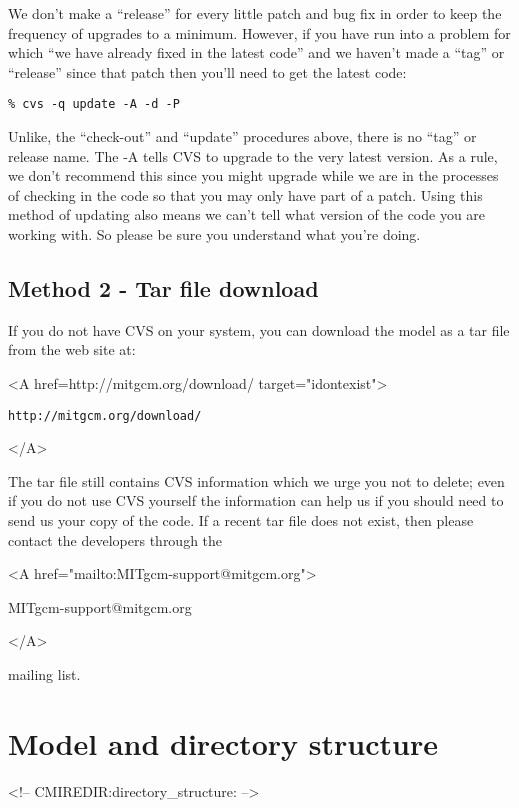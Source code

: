 We don't make a ``release'' for every little patch and bug fix in
order to keep the frequency of upgrades to a minimum. However, if you
have run into a problem for which ``we have already fixed in the
latest code'' and we haven't made a ``tag'' or ``release'' since that
patch then you'll need to get the latest code:
\begin{verbatim}
% cvs -q update -A -d -P
\end{verbatim}
Unlike, the ``check-out'' and ``update'' procedures above, there is no
``tag'' or release name. The -A tells CVS to upgrade to the
very latest version. As a rule, we don't recommend this since you
might upgrade while we are in the processes of checking in the code so
that you may only have part of a patch. Using this method of updating
also means we can't tell what version of the code you are working
with. So please be sure you understand what you're doing.

\subsection{Method 2 - Tar file download}
\label{sec:conventionalDownload}

If you do not have CVS on your system, you can download the model as a
tar file from the web site at:
\begin{rawhtml} <A href=http://mitgcm.org/download/ target="idontexist"> \end{rawhtml}
\begin{verbatim}
http://mitgcm.org/download/
\end{verbatim}
\begin{rawhtml} </A> \end{rawhtml}
The tar file still contains CVS information which we urge you not to
delete; even if you do not use CVS yourself the information can help
us if you should need to send us your copy of the code.  If a recent
tar file does not exist, then please contact the developers through
the 
\begin{rawhtml} <A href="mailto:MITgcm-support@mitgcm.org"> \end{rawhtml}
MITgcm-support@mitgcm.org
\begin{rawhtml} </A> \end{rawhtml}
mailing list.

\section{Model and directory structure}
\begin{rawhtml}
<!-- CMIREDIR:directory_structure: -->
\end{rawhtml}

